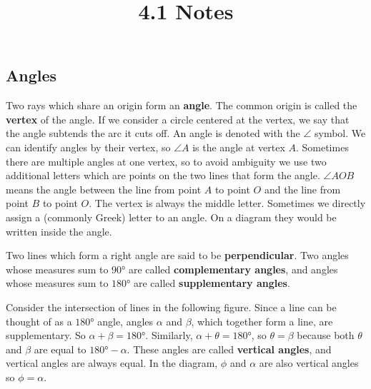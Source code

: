 \documentclass{article}
\title{4.1 Notes}
\author{}
\date{}
\begin{document}
\maketitle

\begin{multicols}{2}
	\section*{Angles}
	Two rays which share an origin form an \textbf{angle}.
	The common origin is called the \textbf{vertex} of the angle.
	If we consider a circle centered at the vertex, we say that the angle subtends the arc it cuts off.
	An angle is denoted with the $\angle$ symbol.
	We can identify angles by their vertex, so $\angle A$ is the angle at vertex $A$.
	Sometimes there are multiple angles at one vertex, so to avoid ambiguity we use two additional letters which are points on the two lines that form the angle.
	$\angle AOB$ means the angle between the line from point $A$ to point $O$ and the line from point $B$ to point $O$.
	The vertex is always the middle letter.
	Sometimes we directly assign a (commonly Greek) letter to an angle.
	On a diagram they would be written inside the angle.
	\begin{center}
	\end{center}

	Two lines which form a right angle are said to be \textbf{perpendicular}.
	Two angles whose measures sum to $\ang{90}$ are called \textbf{complementary angles},
	and angles whose measures sum to $\ang{180}$ are called \textbf{supplementary angles}.

	Consider the intersection of lines in the following figure.
	Since a line can be thought of as a $\ang{180}$ angle, angles $\alpha$ and $\beta$, which together form a line, are supplementary.
	So $\alpha + \beta = \ang{180}$.
	Similarly, $\alpha + \theta = \ang{180}$, so $\theta = \beta$ because both $\theta$ and $\beta$ are equal to $\ang{180} - \alpha$.
	These angles are called \textbf{vertical angles}, and vertical angles are always equal.
	In the diagram, $\phi$ and $\alpha$ are also vertical angles so $\phi = \alpha$.
	\begin{center}
	\end{center}


\end{multicols}
\end{document}
